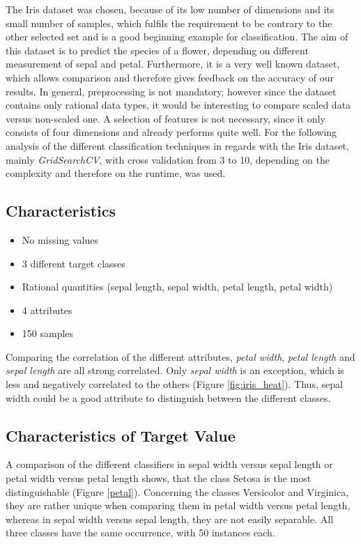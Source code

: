 The Iris dataset was chosen, because of its low number of dimensions and its small number of samples, which fulfils the requirement to be contrary to the other selected set and is a good beginning example for classification. The aim of this dataset is to predict the species of a flower, depending on different measurement of sepal and petal. Furthermore, it is a very well known dataset, which allows comparison and therefore gives feedback on the accuracy of our results. In general, preprocessing is not mandatory, however since the dataset contains only rational data types, it would be interesting to compare scaled data versus non-scaled one. A selection of features is not necessary, since it only consists of four dimensions and already performs quite well. For the following analysis of the different classification techniques in regards with the Iris dataset, mainly \textit{GridSearchCV}, with cross validation from 3 to 10, depending on the complexity and therefore on the runtime, was used. 

\subsection{Characteristics}

\begin{itemize}
\item No missing values
\item 3 different target classes
\item Rational quantities (sepal length, sepal width, petal length, petal width)
\item 4 attributes
\item 150 samples
\end{itemize}

Comparing the correlation of the different attributes, \textit{petal width}, \textit{petal length} and \textit{sepal length} are all strong correlated. Only \textit{sepal width} is an exception, which is less and negatively correlated to the others (Figure \ref{fig:iris_heat}). Thus, sepal width could be a good attribute to distinguish between the different classes.


\subsection{Characteristics of Target Value}
A comparison of the different classifiers in sepal width versus sepal length or petal width versus petal length shows, that the class Setosa is the most distinguishable (Figure \ref{petal}). Concerning the classes Versicolor and Virginica, they are rather unique when comparing them in petal width versus petal length, whereas in sepal width versus sepal length, they are not easily separable. All three classes have the same occurrence, with 50 instances each.

